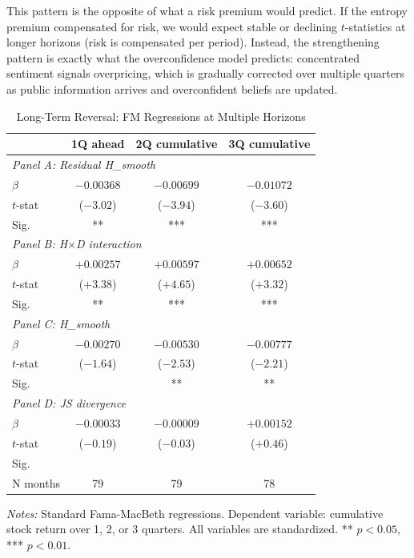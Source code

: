 \documentclass[12pt,a4paper]{article}
\begin{document}
This pattern is the opposite of what a risk premium would predict. If the entropy premium compensated for risk, we would expect stable or declining $t$-statistics at longer horizons (risk is compensated per period). Instead, the strengthening pattern is exactly what the \citet{Daniel1998} overconfidence model predicts: concentrated sentiment signals overpricing, which is gradually corrected over multiple quarters as public information arrives and overconfident beliefs are updated.

\begin{table}[H]
\centering
\caption{Long-Term Reversal: FM Regressions at Multiple Horizons}
\label{tab:horizon}
\small
\begin{tabular}{lccc}
\toprule
 & 1Q ahead & 2Q cumulative & 3Q cumulative \\
\midrule
\multicolumn{4}{l}{\textit{Panel A: Residual H\_smooth}} \\
$\beta$ & $-0.00368$ & $-0.00699$ & $-0.01072$ \\
$t$-stat & ($-3.02$) & ($-3.94$) & ($-3.60$) \\
Sig. & ** & *** & *** \\
\midrule
\multicolumn{4}{l}{\textit{Panel B: H$\times$D interaction}} \\
$\beta$ & $+0.00257$ & $+0.00597$ & $+0.00652$ \\
$t$-stat & ($+3.38$) & ($+4.65$) & ($+3.32$) \\
Sig. & ** & *** & *** \\
\midrule
\multicolumn{4}{l}{\textit{Panel C: H\_smooth}} \\
$\beta$ & $-0.00270$ & $-0.00530$ & $-0.00777$ \\
$t$-stat & ($-1.64$) & ($-2.53$) & ($-2.21$) \\
Sig. & & ** & ** \\
\midrule
\multicolumn{4}{l}{\textit{Panel D: JS divergence}} \\
$\beta$ & $-0.00033$ & $-0.00009$ & $+0.00152$ \\
$t$-stat & ($-0.19$) & ($-0.03$) & ($+0.46$) \\
Sig. & & & \\
\midrule
N months & 79 & 79 & 78 \\
\bottomrule
\end{tabular}
\end{table}
\noindent\textit{Notes:} Standard Fama-MacBeth regressions. Dependent variable: cumulative stock return over 1, 2, or 3 quarters. All variables are standardized. ** $p<0.05$, *** $p<0.01$.
\end{document}
